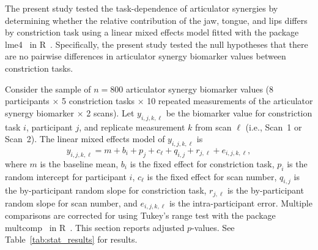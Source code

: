 \documentclass[preprint]{JASAnew}\usepackage[]{graphicx}\usepackage[]{color}
\begin{document}
The present study tested the task-dependence of articulator synergies by determining whether the relative contribution of the jaw, tongue, and lips differs by constriction task using a linear mixed effects model fitted with the package lme4~\citep{bates2015fitting} in R~\citep{r2017language}. Specifically, the present study tested the null hypotheses that there are no pairwise differences in articulator synergy biomarker values between constriction tasks.

Consider the sample of $n=800$ articulator synergy biomarker values (\num{8} participants $\times$ \num{5} constriction tasks $\times$ \num{10} repeated measurements of the articulator synergy biomarker $\times$ \num{2} scans). Let $y_{i,j,k,\ell}$ be the biomarker value for constriction task $i$, participant $j$, and replicate measurement $k$ from scan $\ell$ (i.e., Scan~\num{1} or Scan~\num{2}). The linear mixed effects model of $y_{i,j,k,\ell}$ is 
%
\begin{equation}
\label{eq:lmm}
y_{i,j,k,\ell} = m + b_i + p_j + c_\ell + q_{i,j} + r_{j,\ell} + e_{i,j,k,\ell},
\end{equation}
%
where $m$ is the baseline mean, $b_i$ is the fixed effect for constriction task, $p_i$ is the random intercept for participant $i$, $c_\ell$ is the fixed effect for scan number, $q_{i,j}$ is the by-participant random slope for constriction task, $r_{j,\ell}$ is the by-participant random slope for scan number, and $e_{i,j,k,\ell}$ is the intra-participant error. Multiple comparisons are corrected for using Tukey's range test with the package multcomp~\citep{hothorn2008simultaneous} in R~\citep{r2017language}. This section reports adjusted $p$-values. See Table~\ref{tab:stat_results} for results.
\end{document}
